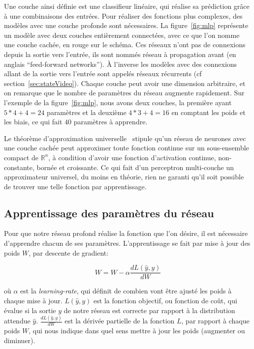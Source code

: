 Une couche ainsi définie est une classifieur linéaire, qui réalise sa prédiction grâce à une combinaisons des entrées.
Pour réaliser des fonctions plus complexes, des modèles avec une couche profonde sont nécessaires.
La figure~\ref{fig:mlp} représente un modèle avec deux couches entièrement connectées, avec ce que l'on nomme une couche cachée, en rouge sur le schéma.
Ces réseaux n'ont pas de connexions depuis la sortie vers l'entrée, ils sont nommés réseau à propagation avant (en anglais ``feed-forward networks''). 
À l'inverse les modèles avec des connexions allant de la sortie vers l'entrée sont appelés réseaux récurrents (cf section~\ref{sec:stateVideo}).
Chaque couche peut avoir une dimension arbitraire, et on remarque que le nombre de paramètres du réseau augmente rapidement.
Sur l'exemple de la figure~\ref{fig:mlp}, nous avons deux couches, la première ayant $5*4 + 4 =24$ paramètres et la deuxième $4*3 + 4 = 16$ en comptant les poids et les biais, ce qui fait $40$ paramètres à apprendre.

Le théorème d'approximation universelle~\cite{hornik1991approximation} stipule qu'un réseau de neurones avec une couche cachée peut approximer toute fonction continue sur un sous-ensemble compact de $\mathbb{R}^n$, à condition d'avoir une fonction d'activation continue, non-constante, bornée et croissante.
Ce qui fait d'un perceptron multi-couche un approximateur universel, du moins en théorie, rien ne garanti qu'il soit possible de trouver une telle fonction par apprentissage.







\subsection{Apprentissage des paramètres du réseau}

Pour que notre réseau profond réalise la fonction que l'on désire, il est nécessaire d'apprendre chacun de ses paramètres.
L'apprentissage se fait par mise à jour des poids $W$, par descente de gradient:

\begin{equation}
W = W - \alpha \frac{dL(\hat{y}, y)}{dW}
\label{eq:sgd}
\end{equation}

où $\alpha$ est la \textit{learning-rate}, qui définit de combien vont être ajusté les poids à chaque mise à jour. 
$L(\hat{y}, y)$ est la fonction objectif, ou fonction de coût, qui évalue si la sortie $y$ de notre réseau est correcte par rapport à la distribution attendue $\hat{y}$.
$\frac{dL(\hat{y}, y)}{dW}$ est la dérivée partielle de la fonction $L$, par rapport à chaque poids $W$, qui nous indique dans quel sens mettre à jour les poids (augmenter ou diminuer).



